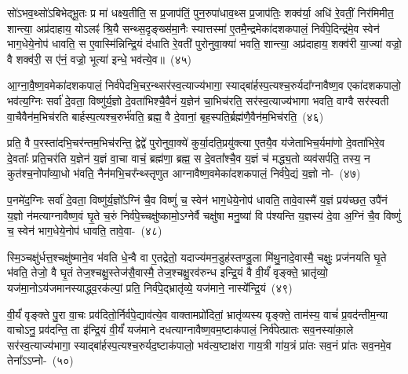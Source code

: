 सो॑\-ऽभव॒थ्सो॑\-ऽबिभेद्भू॒तः प्र मा॑ धक्ष्य॒तीति॒ स प्र॒जा\-प॑तिं॒ पुन॒रुपा॑धाव॒थ्स प्र॒जा\-प॑तिः॒ शक्व॑र्या॒ अधि॑ रे॒वतीं॒ निर॑मिमीत॒ शान्त्या॒ अप्र॑दाहाय॒ यो\-ऽलꣴ॑ श्रि॒यै सन्थ्स॒दृङ्ख्स॑मा॒नैः स्यात्तस्मा॑ ए॒तमै॒न्द्रमेका॑\-दश\-कपालं॒ निर्व॑पे॒दिन्द्र॑मे॒व स्वेन॑ भाग॒धेये॒नोप॑ धावति॒ स ए॒वास्मि॑न्निन्द्रि॒यं द॑धाति रे॒वती॑ पुरोनुवा॒क्या॑ भवति॒ शान्त्या॒ अप्र॑दाहाय॒ शक्व॑री या॒ज्या॑ वज्रो॒ वै शक्व॑री॒ स ए॑नं॒ वज्रो॒ भूत्या॑ इन्धे॒ भव॑त्ये॒व॥~(४५)

{\anuvakamend[{अपि॒ तꣴ स्यु॑र्वैन्ध भवति॒ चतु॑र्दश च}]}%

आ॒ग्ना॒वै॒ष्ण॒वमेका॑दशकपालं॒ निर्व॑पेदभि॒चर॒न्थ्सर॑स्व॒त्याज्य॑\-भागा॒ स्याद्बा॑र्\mbox{}हस्प॒त्यश्च॒रुर्यदा᳚ग्नावैष्ण॒व एका॑\-दश\-कपालो॒ भव॑त्य॒ग्निः सर्वा॑ दे॒वता॒ विष्णु॑र्य॒ज्ञो दे॒वता॑भिश्चै॒वैनं॑ य॒ज्ञेन॑ चा॒भिच॑रति॒ सर॑स्व॒त्याज्य॑भागा भवति॒ वाग्वै सर॑स्वती वा॒चैवैन॑म॒भिच॑रति बार्\mbox{}हस्प॒त्यश्च॒रुर्भ॑वति॒ ब्रह्म॒ वै दे॒वानां॒ बृह॒स्पति॒र्ब्रह्म॑णै॒वैन॑म॒भिच॑रति॒~(४६)

प्रति॒ वै प॒रस्ता॑दभि॒चर॑न्तम॒भिच॑रन्ति॒ द्वेद्वे॑ पुरोनुवा॒क्ये॑ कुर्या॒दति॒प्रयु॑क्त्या ए॒तयै॒व य॑जेताभिच॒र्यमा॑णो दे॒वता॑भिरे॒व दे॒वताः᳚ प्रति॒चर॑ति य॒ज्ञेन॑ य॒ज्ञं वा॒चा वाचं॒ ब्रह्म॑णा॒ ब्रह्म॒ स दे॒वता᳚श्चै॒व य॒ज्ञं च॑ मद्ध्य॒तो व्यव॑सर्पति॒ तस्य॒ न कुत॑श्च॒नोपा᳚व्या॒धो भ॑वति॒ नैन॑मभि॒चर᳚न्थ्स्तृणुत आग्नावैष्ण॒वमेका॑\-दश\-कपालं॒ निर्व॑पे॒द्यं य॒ज्ञो नो-~(४७)

प॒नमे॑द॒ग्निः सर्वा॑ दे॒वता॒ विष्णु॑र्य॒ज्ञो᳚\-ऽग्निं चै॒व विष्णुं॑ च॒ स्वेन॑ भाग॒धेये॒नोप॑ धावति॒ तावे॒वास्मै॑ य॒ज्ञं प्रय॑च्छत॒ उपै॑नं य॒ज्ञो न॑मत्याग्नावैष्ण॒वं घृ॒ते च॒रुं निर्व॑पे॒च्चक्षु॑ष्कामो॒\-ऽग्नेर्वै चक्षु॑षा मनु॒ष्या॑ वि प॑श्यन्ति य॒ज्ञस्य॑ दे॒वा अ॒ग्निं चै॒व विष्णुं॑ च॒ स्वेन॑ भाग॒धेये॒नोप॑ धावति॒ तावे॒वा-~(४८)

स्मि॒ञ्चक्षु॑र्धत्त॒श्चक्षु॑ष्माने॒व भ॑वति धे॒न्वै वा ए॒तद्रेतो॒ यदाज्य॑मन॒डुह॑स्तण्डु॒ला मि॑थु॒नादे॒वास्मै॒ चक्षुः॒ प्रज॑नयति घृ॒ते भ॑वति॒ तेजो॒ वै घृ॒तं तेज॒श्चक्षु॒स्तेज॑सै॒वास्मै॒ तेज॒श्चक्षु॒रव॑रुन्ध इन्द्रि॒यं वै वी॒र्यं॑ वृङ्क्ते॒ भ्रातृ॑व्यो॒ यज॑मा॒नो\-ऽय॑जमानस्याद्ध्व॒रक॑ल्पां॒ प्रति॒ निर्व॑पे॒द्भ्रातृ॑व्ये॒ यज॑माने॒ नास्ये᳚न्द्रि॒यं~(४९)

वी॒र्यं॑ वृङ्क्ते पु॒रा वा॒चः प्रव॑दितो॒र्निर्व॑पे॒द्याव॑त्ये॒व वाक्तामप्रो॑दितां॒ भ्रातृ॑व्यस्य वृङ्क्ते॒ ताम॑स्य॒ वाचं॑ प्र॒वद॑न्तीम॒न्या वाचो\-ऽनु॒ प्रव॑दन्ति॒ ता इ॑न्द्रि॒यं वी॒र्यं॑ यज॑माने दधत्याग्ना\-वैष्ण॒व\-म॒ष्टा\-क॑पालं॒ निर्व॑पेत्प्रातः सव॒नस्या॑का॒ले सर॑स्व॒त्याज्य॑भागा॒ स्याद्बा॑र्\mbox{}हस्प॒त्यश्च॒रुर्यद॒ष्टाक॑पालो॒ भव॑त्य॒ष्टाक्ष॑रा गाय॒त्री गा॑य॒त्रं प्रा॑तः सव॒नं प्रा॑तः सव॒नमे॒व तेना᳚\-ऽऽ\-प्नो-~(५०)

